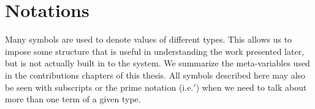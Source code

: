 \documentclass[12pt]{UOthesis}
\theoremstyle{remarkstyle}
\begin{document}
% 
%
%
%
%
%
%
%
%
%
%
\appendix



\chapter{Notations}
\label{ch:notations}

\begin{flushleft}
Many symbols are used to denote values of different types. This allows us to impose some structure that is useful in understanding the work presented later, but is not actually built in to the system. We summarize the meta-variables used in the contributions chapters of this thesis. All symbols described here may also be seen with subscripts or the prime notation (i.e.$'$) when we need to talk about more than one term of a given type.
\end{flushleft}
\end{document}
